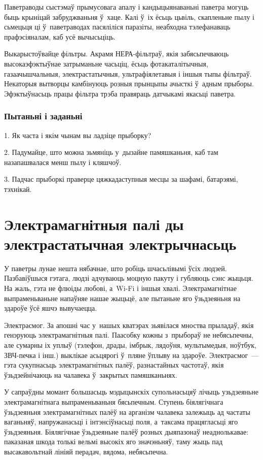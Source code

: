 Паветраводы сыстэмаў прымусовага апалу і кандыцыянаваньні паветра могуць быць крыніцай забруджваньня ў~хаце. Калі ў~іх ёсьць цьвіль, скапленьне пылу і сьмецьця ці ў~паветраводах пасяліліся паразіты, неабходна тэлефанаваць прафэсіяналам, каб усё вычысьціць.

Выкарыстоўвайце фільтры. Акрамя НЕРА-фільтраў, якія забясьпечваюць высокаэфэктыўнае затрыманьне часьціц, ёсьць фотакаталітычныя, газаачышчальныя, электрастатычныя, ультрафіялетавыя і іншыя тыпы фільтраў. Некаторыя вытворцы камбінуюць розныя прынцыпы ачысткі ў~адным прыборы. Эфэктыўнасьць працы фільтра трэба правяраць датчыкамі якасьці паветра.

\subsubsection{Пытаньні і заданьні}

1. Як часта і якім чынам вы ладзіце прыборку?

2. Падумайце, што можна зьмяніць у~дызайне памяшканьня, каб там назапашвалася менш пылу і кляшчоў.

3. Падчас прыборкі праверце цяжкадаступныя месцы за шафамі, батарэямі, тэхнікай.


\section{Электрамагнітныя палі ды электрастатычная электрычнасьць}

У паветры лунае нешта нябачнае, што робіць шчасьлівымі ўсіх людзей. Пазбавіўшыся гэтага, людзі адчуваюць моцную пакуту і губляюць сэнс жыцьця. На жаль, гэта не флюіды любові, а~Wi-Fi і іншыя хвалі. Электрамагнітнае выпраменьваньне напаўняе нашае жыцьцё, але пытаньне яго ўзьдзеяньня на здароўе ўсё яшчэ вывучаецца.

Электрасмог. За апошні час у~нашых кватэрах зьявілася мноства прыладаў, якія генэруюць электрамагнітныя палі. Паасобку кожны з~прыбораў не небясьпечны, але сумарны іх уплыў (тэлефон, драды, імбрык, лядоўня, мультымедыя, ноўтбук, ЗВЧ-печка і інш.) выклікае асьцярогі ў~пляне ўплыву на здароўе. Электрасмог~--- гэта сукупнасьць электрамагнітных палёў, разнастайных частотаў, якія ўзьдзейнічаюць на чалавека ў~закрытых памяшканьнях.

У сапраўдны момант большасьць мэдыцынскіх супольнасьцяў лічыць узьдзеяньне электрамагнітнага выпраменьваньня бясьпечным. Ступень біялягічнага ўзьдзеяньня электрамагнітных палёў на арганізм чалавека залежыць ад частаты ваганьняў, напружанасьці і інтэнсіўнасьці поля, а~таксама працягласьці яго ўзьдзеяньня. Біялягічнае ўзьдзеяньне палёў розных дыяпазонаў неаднолькавае: паказаная шкода толькі вельмі высокіх яго значэньняў, таму жыць пад высакавольтнай лініяй перадач, вядома, небясьпечна.

